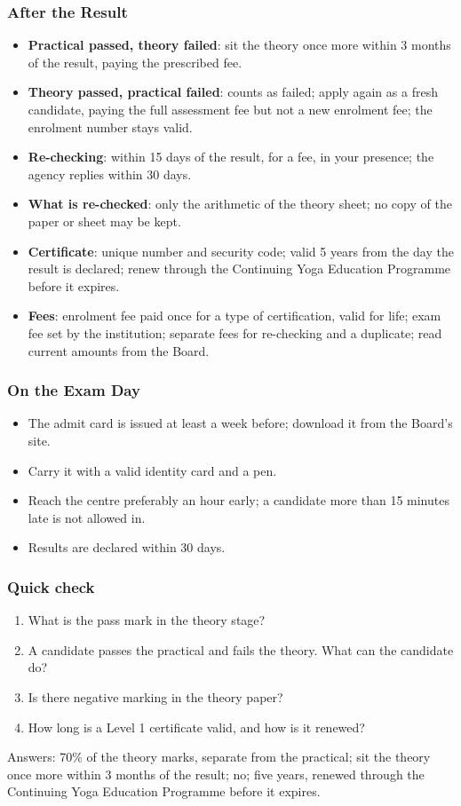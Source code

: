 \begin{frame}[fragile]\frametitle{After the Result}
\begin{itemize}
\item \textbf{Practical passed, theory failed}: sit the theory once more within 3 months of the result, paying the prescribed fee.
\item \textbf{Theory passed, practical failed}: counts as failed; apply again as a fresh candidate, paying the full assessment fee but not a new enrolment fee; the enrolment number stays valid.
\item \textbf{Re-checking}: within 15 days of the result, for a fee, in your presence; the agency replies within 30 days.
\item \textbf{What is re-checked}: only the arithmetic of the theory sheet; no copy of the paper or sheet may be kept.
\item \textbf{Certificate}: unique number and security code; valid 5 years from the day the result is declared; renew through the Continuing Yoga Education Programme before it expires.
\item \textbf{Fees}: enrolment fee paid once for a type of certification, valid for life; exam fee set by the institution; separate fees for re-checking and a duplicate; read current amounts from the Board.
\end{itemize}
\end{frame}

\begin{frame}[fragile]\frametitle{On the Exam Day}
\begin{itemize}
\item The admit card is issued at least a week before; download it from the Board's site.
\item Carry it with a valid identity card and a pen.
\item Reach the centre preferably an hour early; a candidate more than 15 minutes late is not allowed in.
\item Results are declared within 30 days.
\end{itemize}
\end{frame}

\begin{frame}[fragile]\frametitle{Quick check}
\begin{enumerate}
\item What is the pass mark in the theory stage?
\item A candidate passes the practical and fails the theory. What can the candidate do?
\item Is there negative marking in the theory paper?
\item How long is a Level 1 certificate valid, and how is it renewed?
\end{enumerate}
{\small Answers: 70\% of the theory marks, separate from the practical; sit the theory once more within 3 months of the result; no; five years, renewed through the Continuing Yoga Education Programme before it expires.}
\end{frame}